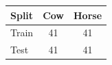 \begin{tabular}{lcc}
\toprule
Split & Cow & Horse \\
\midrule
Train & 41 & 41 \\
Test & 41 & 41 \\
\bottomrule
\end{tabular}
